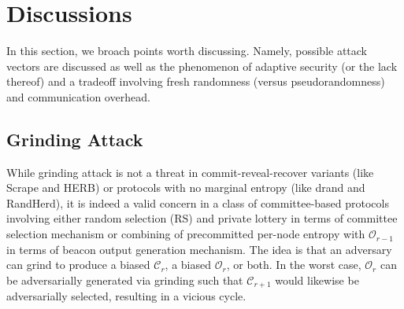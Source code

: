 \documentclass[letterpaper,twocolumn,10pt]{article}
\theoremstyle{definition}
\theoremstyle{remark}
\begin{document}
\section{Discussions}
\label{section:discussions}
In this section, we broach points worth discussing. Namely, possible attack vectors are discussed as well as the phenomenon of adaptive security (or the lack thereof) and a tradeoff involving fresh randomness (versus pseudorandomness) and communication overhead.

\subsection{Grinding Attack}
While grinding attack is not a threat in commit-reveal-recover variants (like Scrape and HERB) or protocols with no marginal entropy (like drand and RandHerd), it is indeed a valid concern in a class of committee-based protocols involving either random selection (RS) and private lottery in terms of committee selection mechanism or combining of precommitted per-node entropy with $\mathcal{O}_{r - 1}$ in terms of beacon output generation mechanism. The idea is that an adversary can grind to produce a biased $\mathcal{C}_r$, a biased $\mathcal{O}_r$, or both. In the worst case, $\mathcal{O}_r$ can be adversarially generated via grinding such that $\mathcal{C}_{r + 1}$ would likewise be adversarially selected, resulting in a vicious cycle.
\end{document}
